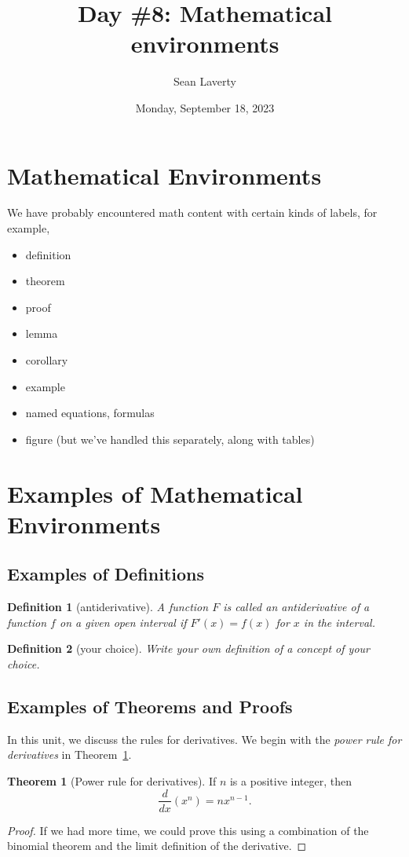 \documentclass[12pt]{article}
\title{Day \#8: Mathematical environments}
\author{Sean Laverty}
\date{Monday, September 18, 2023}
\newtheorem{dfn}{Definition}[subsection]
\theoremstyle{definition}%
\newtheorem{thm}{Theorem}[subsection]
\begin{document}
\maketitle
\newpage

\section{Mathematical Environments}
We have probably encountered math content with certain kinds of labels, for example,
\begin{itemize}
\item definition
\item theorem
\item proof
\item lemma
\item corollary
\item example
\item named equations, formulas
\item figure (but we've handled this separately, along with tables)
\end{itemize}

\section{Examples of Mathematical Environments}
\subsection{Examples of Definitions}

\begin{dfn}[antiderivative]
A function \(F\) is called an \emph{antiderivative} of a function \(f\) on a given open interval if \(F'(x) = f(x)\) for \(x\) in the interval.
\end{dfn}

\begin{dfn}[your choice]
Write your own definition of a concept of \emph{your choice}.
\end{dfn}

\subsection{Examples of Theorems and Proofs}
In this unit, we discuss the rules for derivatives.  We begin with the \emph{power rule for derivatives} in Theorem~\ref{thm::power}.

\begin{thm}[Power rule for derivatives]\label{thm::power}
If \(n\) is a positive integer, then \[\frac{d}{dx}\left(x^{n}\right) = nx^{n-1}.\]
\end{thm}
\begin{proof}
If we had more time, we could prove this using a combination of the binomial theorem and the limit definition of the derivative.
\end{proof}
\end{document}
